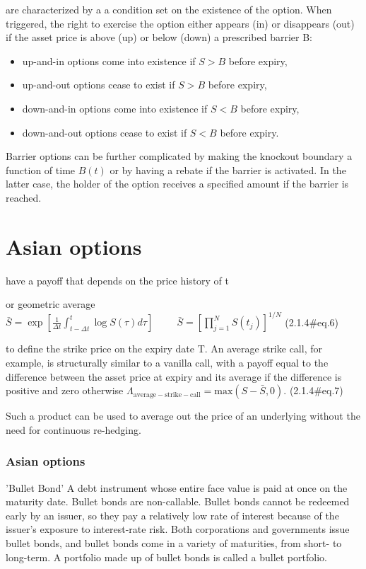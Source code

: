 are characterized by a a condition set on the existence of the option. When triggered, the right to exercise the option either appears (in) or disappears (out) if the asset price is above (up) or below (down) a prescribed barrier B:
\begin{itemize}
\item up-and-in options come into existence if $S > B$ before expiry,  
\item up-and-out options cease to exist if $S > B$ before expiry,  
\item down-and-in options come into existence if $S < B$ before expiry,  
\item down-and-out options cease to exist if $S < B$ before expiry.  
\end{itemize}
Barrier options can be further complicated by making the knockout boundary a function of time $B(t)$ or by having a rebate if the barrier is activated. In the latter case, the holder of the option receives a specified amount if the barrier is reached.
\section{Asian options}
have a payoff that depends on the price history of t


or geometric average
 $\displaystyle \bar{S}=\exp\left[\frac{1}{\Delta t}\int_{t-\Delta t}^{t} \log S(\tau)d\tau \right]\hspace{1cm} \bar{S}=\left[\prod_{j=1}^N S(t_j)\right]^{1/N}$	 (2.1.4#eq.6)


to define the strike price on the expiry date T. An average strike call, for example, is structurally similar to a vanilla call, with a payoff equal to the difference between the asset price at expiry and its average if the difference is positive and zero otherwise
 $\displaystyle \Lambda_\mathrm{average-strike-call}=\mathrm{max}(S-\bar{S},0).$	 (2.1.4#eq.7)


Such a product can be used to average out the price of an underlying without the need for continuous re-hedging.




\begin{frame}
\frametitle{Asian options}

'Bullet Bond'
A debt instrument whose entire face value is paid at once on the maturity date. Bullet bonds are non-callable. Bullet bonds cannot be redeemed early by an issuer, so they pay a relatively low rate of interest because of the issuer's exposure to interest-rate risk. Both corporations and governments issue bullet bonds, and bullet bonds come in a variety of maturities, from short- to long-term. A portfolio made up of bullet bonds is called a bullet portfolio. 
\end{frame}



